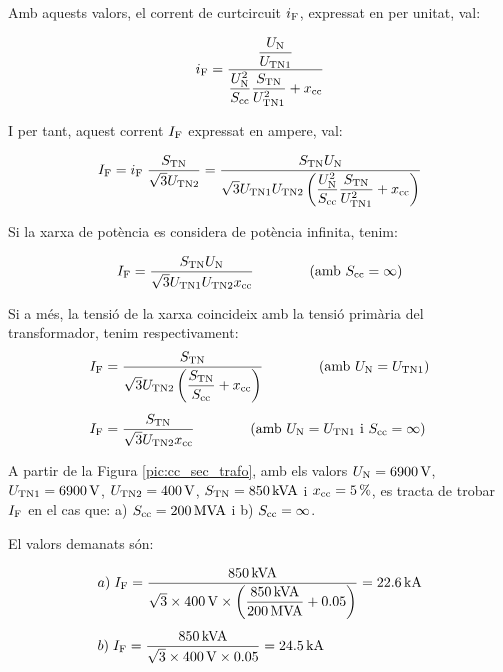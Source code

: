 Amb aquests valors, el corrent de curtcircuit $i_\mathrm{F}$, expressat
en per unitat, val:

\begin{equation}
    i_\mathrm{F} = \frac{\dfrac{U_\mathrm{N}}{U_\mathrm{TN1}}}{\dfrac{U_\mathrm{N}^2}{S_\mathrm{cc}}
    \dfrac{S_\mathrm{TN}}{U_\mathrm{TN1}^2} + x_\mathrm{cc}}
\end{equation}

I per tant, aquest corrent $I_\mathrm{F}$ expressat en ampere, val:

\begin{equation}
    I_\mathrm{F} = i_\mathrm{F}\; \frac{S_\mathrm{TN}}{\sqrt{3}U_\mathrm{TN2}} =
    \frac{S_\mathrm{TN} U_\mathrm{N}}{\sqrt{3} U_\mathrm{TN1}U_\mathrm{TN2}
    \left(\dfrac{U_\mathrm{N}^2}{S_\mathrm{cc}}
    \dfrac{S_\mathrm{TN}}{U_\mathrm{TN1}^2} + x_\mathrm{cc}\right)}
\end{equation}

Si la xarxa de potència es considera de potència infinita, tenim:

\begin{equation}
    I_\mathrm{F} = \frac{S_\mathrm{TN} U_\mathrm{N}}{\sqrt{3} U_\mathrm{TN1}U_\mathrm{TN2}
    x_\mathrm{cc}}\qquad\qquad (\text{amb }S_\mathrm{cc}=\infty)
\end{equation}

Si a més, la tensió de la xarxa coincideix amb la tensió primària
del transformador, tenim respectivament:
\begin{align}
    I_\mathrm{F} &= \frac{S_\mathrm{TN}}{\sqrt{3} U_\mathrm{TN2}
    \left(\dfrac{S_\mathrm{TN}}{S_\mathrm{cc}} +
    x_\mathrm{cc}\right)}\qquad\qquad(\text{amb }U_\mathrm{N}=U_\mathrm{TN1})\\[1ex]
    I_\mathrm{F} &= \frac{S_\mathrm{TN}}{\sqrt{3} U_\mathrm{TN2}
    x_\mathrm{cc}}\qquad\qquad(\text{amb }U_\mathrm{N}=U_\mathrm{TN1}\text{ i }
    S_\mathrm{cc}=\infty)
\end{align}

\begin{exemple}
    A partir de la Figura \vref{pic:cc_sec_trafo}, amb els valors
    $U_\mathrm{N}=\SI{6900}{V}$, $U_\mathrm{TN1}=\SI{6900}{V}$,
    $U_\mathrm{TN2}=\SI{400}{V}$, $S_\mathrm{TN}=\SI{850}{kVA}$ i
    $x_\mathrm{cc}=\SI{5}{\percent}$, es tracta de trobar $I_\mathrm{F}$ en el cas
    que: a) $S_\mathrm{cc}=\SI{200}{MVA}$ i b) $S_\mathrm{cc}=\infty$.

    El valors demanats són:

    \begin{align*}
       &a)\;I_\mathrm{F} = \frac{\SI{850}{kVA}}{\sqrt{3}\times \SI{400}{V}\times
       \left(\dfrac{\SI{850}{kVA}}{\SI{200}{MVA}} +
       \num{0,05}\right)} = \SI{22,6}{kA} \\[1ex]
       &b)\;I_\mathrm{F} = \frac{\SI{850}{kVA}}{\sqrt{3}\times \SI{400}{V}\times
       \num{0,05}} = \SI{24,5}{kA}
    \end{align*}

\end{exemple}



